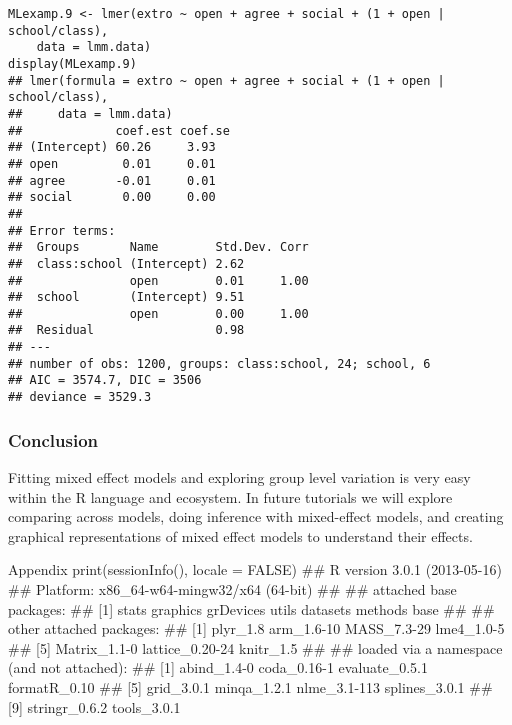 \begin{framed}
\begin{verbatim}
MLexamp.9 <- lmer(extro ~ open + agree + social + (1 + open | school/class), 
    data = lmm.data)
display(MLexamp.9)
## lmer(formula = extro ~ open + agree + social + (1 + open | school/class), 
##     data = lmm.data)
##             coef.est coef.se
## (Intercept) 60.26     3.93  
## open         0.01     0.01  
## agree       -0.01     0.01  
## social       0.00     0.00  
## 
## Error terms:
##  Groups       Name        Std.Dev. Corr 
##  class:school (Intercept) 2.62          
##               open        0.01     1.00 
##  school       (Intercept) 9.51          
##               open        0.00     1.00 
##  Residual                 0.98          
## ---
## number of obs: 1200, groups: class:school, 24; school, 6
## AIC = 3574.7, DIC = 3506
## deviance = 3529.3
\end{verbatim}
\end{framed}

\subsubsection{Conclusion}
Fitting mixed effect models and exploring group level variation is very easy within the R language and ecosystem. In future tutorials we will explore comparing across models, doing inference with mixed-effect models, and creating graphical representations of mixed effect models to understand their effects.

Appendix
print(sessionInfo(), locale = FALSE)
## R version 3.0.1 (2013-05-16)
## Platform: x86_64-w64-mingw32/x64 (64-bit)
## 
## attached base packages:
## [1] stats     graphics  grDevices utils     datasets  methods   base     
## 
## other attached packages:
## [1] plyr_1.8        arm_1.6-10      MASS_7.3-29     lme4_1.0-5     
## [5] Matrix_1.1-0    lattice_0.20-24 knitr_1.5      
## 
## loaded via a namespace (and not attached):
##  [1] abind_1.4-0    coda_0.16-1    evaluate_0.5.1 formatR_0.10  
##  [5] grid_3.0.1     minqa_1.2.1    nlme_3.1-113   splines_3.0.1 
##  [9] stringr_0.6.2  tools_3.0.1
